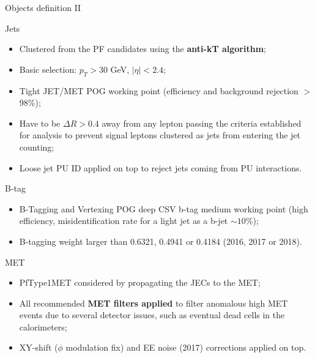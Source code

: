 \documentclass[8pt]{beamer}
\begin{document}
\begin{frame}{Objects definition II}
\justifying
\vspace{5pt} \begin{block}{\centering Jets}\end{block}
\begin{itemize}
\justifying
\item Clustered from the PF candidates using the \textbf{anti-kT algorithm};
\item Basic selection: $p_T > 30$ GeV, $|\eta| < 2.4$;
\item \alert{Tight JET/MET POG} working point (efficiency and background rejection $>$ 98\%);
\item Have to be $\Delta R > 0.4$ away from any lepton passing the criteria established for analysis to prevent signal leptons clustered as jets from entering the jet counting;
\item Loose jet PU ID applied on top to reject jets coming from PU interactions.
\end{itemize} \vfill

\vspace{5pt}
\begin{block}{\centering B-tag}\end{block}
\begin{itemize}
\justifying
\item B-Tagging and Vertexing POG \alert{deep CSV b-tag medium working point} (high efficiency, misidentification rate for a light jet as a b-jet $\sim 10\%$);
\item B-tagging weight larger than 0.6321, 0.4941 or 0.4184 (2016, 2017 or 2018).
\end{itemize} \vfill

\vspace{5pt}
\begin{block}{\centering MET}\end{block}
\begin{itemize}
\justifying
\item \alert{PfType1MET} considered by propagating the JECs to the MET;
\item All recommended \textbf{MET filters applied} to filter anomalous high MET events due to several detector issues, such as eventual dead cells in the calorimeters;
\item XY-shift ($\phi$ modulation fix) and EE noise (2017) corrections applied on top.
\end{itemize} \vfill
\end{frame}
\end{document}
